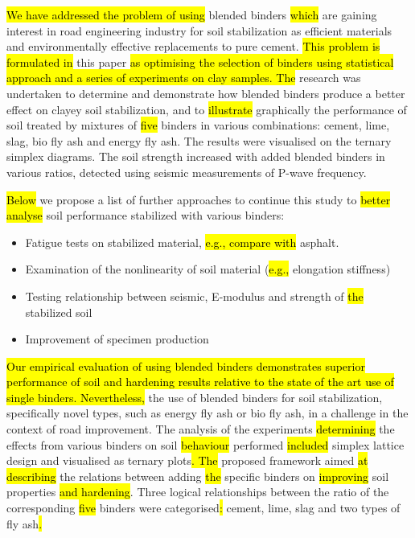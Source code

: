 \documentclass[constrmater,article,submit,pdftex,moreauthors]{Definitions/mdpi}
\begin{document}
\hl{We have addressed the problem of using }blended binders \hl{which }are gaining interest in road engineering industry for soil stabilization as\hl{ }efficient materials and environmentally effective replacements to pure cement. \hl{This problem is formulated in }this paper\hl{ as optimising the selection of binders using statistical approach and a series of experiments on clay samples. The }research was undertaken to determine and demonstrate how blended binders produce a better effect on clayey soil stabilization, and to \hl{illustrate} graphically the performance of soil treated by mixtures of \hl{five} binders in various combinations: cement, lime, slag, bio fly ash and energy fly ash. The results were visualised on the ternary\hl{ }simplex\hl{ }diagrams. The soil strength increased with added blended binders in various ratios,\hl{ }detected using seismic measurements of P-wave frequency. 

\hl{Below} we propose a list of further approaches to continue this study to \hl{better analyse }soil performance stabilized with various binders:
\begin{itemize}
	\item	Fatigue tests on stabilized material, \hl{e.g., compare with }asphalt. 
	\item Examination of the nonlinearity of soil material (\hl{e.g., }elongation stiffness)
	\item Testing relationship between seismic, E-modulus and strength of \hl{the }stabilized soil
	\item Improvement of specimen production
\end{itemize}

\hl{Our empirical evaluation of using blended binders demonstrates superior performance of soil and hardening results relative to the state of the art use of single binders. Nevertheless, }the use of blended binders for soil stabilization, specifically novel types, such as energy fly ash or bio fly ash, in a challenge in the context of road improvement. The analysis of the experiments \hl{determining} the effects from various binders on soil \hl{behaviour} performed \hl{included} simplex lattice design and visualised as ternary plots\hl{. The }proposed framework aimed \hl{at describing }the relations between adding \hl{the }specific binders on \hl{improving }soil properties \hl{and hardening}. Three logical relationships between the ratio of the corresponding \hl{five }binders were categorised\hl{: }cement, lime, slag and two types of fly ash\hl{.} 
\end{document}
